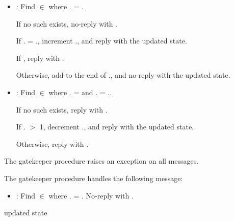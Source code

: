 \begin{itemize}
\item {}: Find  $\in$
   where . = .

  If no such  exists, no-reply with .

  If . = ., increment
  ., and reply  with the updated
  state.

  If , reply  with
  .

  Otherwise, add  to the end of .,
  and no-reply with the updated state.

\item {}: Find  $\in$
   where . =  and
  . = ..

  If no such  exists, reply  with .

  If . $>$ 1, decrement .,
  and reply  with the updated state.

  Otherwise, reply  with .
\end{itemize}

 The gatekeeper
 procedure raises an exception on all messages.

 The gatekeeper
 procedure handles the following message:\antipar

\begin{itemize}
\item {}: Find  $\in$
   where . =
  . No-reply with .
\end{itemize}

\begin{procedure}
\end{procedure}
\returns{} updated state

